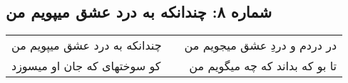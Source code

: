 \begin{center}
\section*{شماره ۸: چندانکه به درد عشق میپویم من}
\label{sec:008}
\begin{longtable}{l p{0.5cm} r}
چندانکه به درد عشق میپویم من
&&
در دردم و دردِ عشق میجویم من
\\
کو سوختهای که جان او میسوزد
&&
تا بو که بداند که چه میگویم من
\\
\end{longtable}
\end{center}
